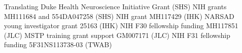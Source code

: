 Translating Duke Health Neuroscience Initiative Grant (SHS)
NIH grants MH111684 and 554DA047258 (SHS)
NIH grant MH117429 (IHK)
NARSAD young investigator grant 25163 (IHK)
NIH F30 fellowship funding MH117851 (JLC)
MSTP training grant support GM007171 (JLC)
NIH F31 fellowship funding 5F31NS113738-03 (TWAB)
